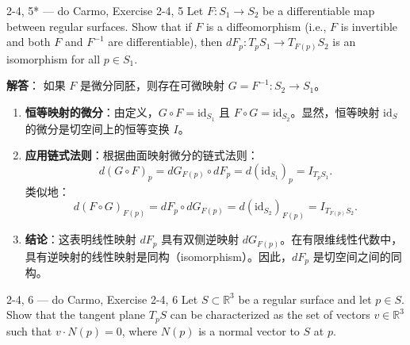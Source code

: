 \begin{exercise}{2-4, 5* — do Carmo, Exercise 2-4, 5}
Let $F: S_1 \to S_2$ be a differentiable map between regular surfaces. Show that if $F$ is a diffeomorphism (i.e., $F$ is invertible and both $F$ and $F^{-1}$ are differentiable), then $dF_p: T_pS_1 \to T_{F(p)}S_2$ is an isomorphism for all $p \in S_1$.
\end{exercise}

\begin{solution}
\textbf{解答}：
如果 $F$ 是微分同胚，则存在可微映射 $G = F^{-1}: S_2 \to S_1$。

\begin{enumerate}
    \item \textbf{恒等映射的微分}：由定义，$G \circ F = \text{id}_{S_1}$ 且 $F \circ G = \text{id}_{S_2}$。显然，恒等映射 $\text{id}_S$ 的微分是切空间上的恒等变换 $I$。
    \item \textbf{应用链式法则}：根据曲面映射微分的链式法则：
    \[
    d(G \circ F)_p = dG_{F(p)} \circ dF_p = d(\text{id}_{S_1})_p = I_{T_pS_1}.
    \]
    类似地：
    \[
    d(F \circ G)_{F(p)} = dF_p \circ dG_{F(p)} = d(\text{id}_{S_2})_{F(p)} = I_{T_{F(p)}S_2}.
    \]
    \item \textbf{结论}：这表明线性映射 $dF_p$ 具有双侧逆映射 $dG_{F(p)}$。在有限维线性代数中，具有逆映射的线性映射是同构（isomorphism）。因此，$dF_p$ 是切空间之间的同构。
\end{enumerate}
\end{solution}

\begin{exercise}{2-4, 6 — do Carmo, Exercise 2-4, 6}
Let $S \subset \mathbb{R}^3$ be a regular surface and let $p \in S$. Show that the tangent plane $T_pS$ can be characterized as the set of vectors $v \in \mathbb{R}^3$ such that $v \cdot N(p) = 0$, where $N(p)$ is a normal vector to $S$ at $p$.
\end{exercise}

